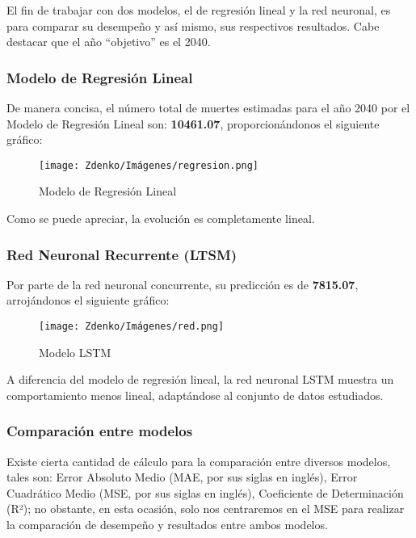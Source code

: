 El fin de trabajar con dos modelos, el de regresión lineal y la red neuronal, es para comparar su desempeño y así mismo, sus respectivos resultados. Cabe destacar que el año ``objetivo'' es el 2040.

\subsubsection{Modelo de Regresión Lineal}

De manera concisa, el número total de muertes estimadas para el año 2040 por el Modelo de Regresión Lineal son: \textbf{10461.07}, proporcionándonos el siguiente gráfico: 

\begin{figure}[H] \centering \texttt{[image: Zdenko/Imágenes/regresion.png]} \caption{Modelo de Regresión Lineal} \label{fig:regresion} \end{figure}

Como se puede apreciar, la evolución es completamente lineal.

\subsubsection{Red Neuronal Recurrente (LTSM)}

Por parte de la red neuronal concurrente, su predicción es de \textbf{7815.07}, arrojándonos el siguiente gráfico: 

\begin{figure}[h] \centering \texttt{[image: Zdenko/Imágenes/red.png]} \caption{Modelo LSTM} \label{fig:red} \end{figure}

A diferencia del modelo de regresión lineal, la red neuronal LSTM muestra un comportamiento menos lineal, adaptándose al conjunto de datos estudiados. 

\subsubsection{Comparación entre modelos}

Existe cierta cantidad de cálculo para la comparación entre diversos modelos, tales son: Error Absoluto Medio (MAE, por sus siglas en inglés), Error Cuadrático Medio (MSE, por sus siglas en inglés), Coeficiente de Determinación (R²); no obstante, en esta ocasión, solo nos centraremos en el MSE para realizar la comparación de desempeño y resultados entre ambos modelos.


